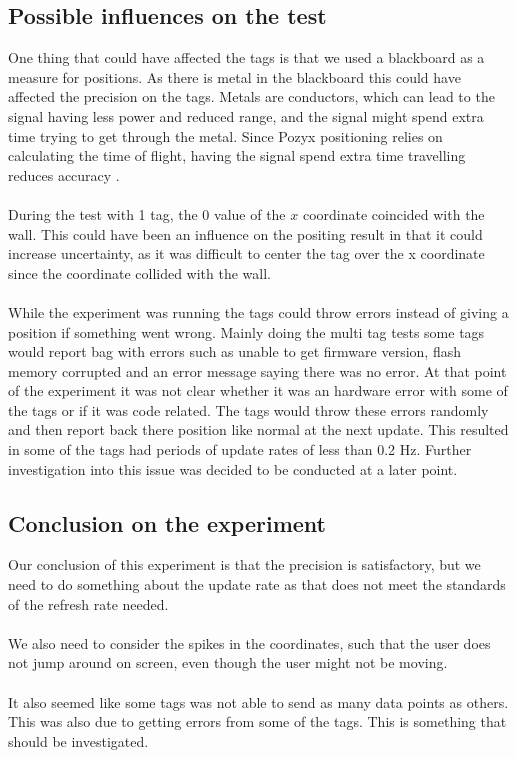 \subsection{Possible influences on the test}
One thing that could have affected the tags is that we used a blackboard as a measure for positions. 
As there is metal in the blackboard this could have affected the precision on the tags.
Metals are conductors, which can lead to the signal having less power and reduced range, and the signal might spend extra time trying to get through the metal.
Since Pozyx positioning relies on calculating the time of flight, having the signal spend extra time travelling reduces accuracy \cite{pozyx-UWBObstacles}. 
\\\\
During the test with 1 tag, the 0 value of the $x$ coordinate coincided with the wall. 
This could have been an influence on the positing result in that it could increase uncertainty, as it was difficult to center the tag over the x coordinate since the coordinate collided with the wall.
\\\\
While the experiment was running the tags could throw errors instead of giving a position if something went wrong.
Mainly doing the multi tag tests some tags would report bag with errors such as unable to get firmware version, flash memory corrupted and an error message saying there was no error.
At that point of the experiment it was not clear whether it was an hardware error with some of the tags or if it was code related.
The tags would throw these errors randomly and then report back there position like normal at the next update.
This resulted in some of the tags had periods of update rates of less than 0.2 Hz.
Further investigation into this issue was decided to be conducted at a later point.

\subsection{Conclusion on the experiment}
Our conclusion of this experiment is that the precision is satisfactory, but we need to do something about the update rate as that does not meet the standards of the refresh rate needed.
\\\\
We also need to consider the spikes in the coordinates, such that the user does not jump around on screen, even though the user might not be moving.
\\\\
It also seemed like some tags was not able to send as many data points as others. This was also due to getting errors from some of the tags.
This is something that should be investigated.
